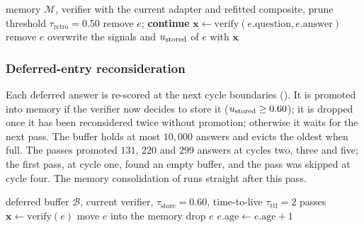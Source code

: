 \begin{algorithm}[!htbp]
\caption[Retroactive re-verification pass (Stage~8).]{Retroactive re-verification pass (Stage~8).}
\label{alg:retroverify}
\begin{algorithmic}[1]
\Require memory $\mathcal{M}$, verifier with the current adapter and refitted composite, prune threshold $\tau_{\text{retro}} = 0.50$
        \State remove $e$; \textbf{continue}
    \EndIf
    \State $\mathbf{x} \gets \mathrm{verify}(e.\text{question}, e.\text{answer})$ 
        \State remove $e$
    \Else
        \State overwrite the signals and $u_{\text{stored}}$ of $e$ with $\mathbf{x}$ 
    \EndIf
\EndFor
\end{algorithmic}
\end{algorithm}

\subsubsection{Deferred-entry reconsideration}
\label{sec:deferred-reconsider}

Each deferred answer is re-scored at the next cycle boundaries (). It is promoted into memory if the verifier now decides to store it ($u_{\text{stored}} \ge 0.60$); it is dropped once it has been reconsidered twice without promotion; otherwise it waits for the next pass. The buffer holds at most $10{,}000$ answers and evicts the oldest when full. The passes promoted $131$, $220$ and $299$ answers at cycles two, three and five; the first pass, at cycle one, found an empty buffer, and the pass was skipped at cycle four. The memory consolidation of  runs straight after this pass.

\begin{algorithm}[!htbp]
\caption[Deferred-entry reconsideration pass (Stage~8).]{Deferred-entry reconsideration pass (Stage~8).}
\label{alg:deferred-reconsider}
\begin{algorithmic}[1]
\Require deferred buffer $\mathcal{B}$, current verifier, $\tau_{\text{store}} = 0.60$, time-to-live $\tau_{\text{ttl}} = 2$ passes
    \State $\mathbf{x} \gets \mathrm{verify}(e)$
        \State move $e$ into the memory
        \State drop $e$
    \Else
        \State $e.\text{age} \gets e.\text{age} + 1$ 
    \EndIf
\EndFor
\end{algorithmic}
\end{algorithm}

